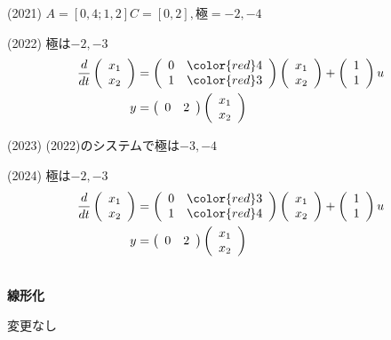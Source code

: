 (2021) $A=[0,4;1,2] C=[0,2], 極=-2,-4$

(2022) 極は{\color{red}$-2, -3$}
\begin{align*}
	\frac{d}{dt}
	\left (
	\begin{array}{c}
	 x_1 \\ x_2 
	\end{array}
	\right )
	& = 
	\left (
	\begin{array}{cc}
	 0 & {\color{red}4} \\
	 1 & {\color{red}3}
	\end{array}
	\right )
	\left (
	\begin{array}{c}
	 x_1 \\ x_2 
	\end{array}
	\right )
	+
	\left (
	\begin{array}{c}
	 1 \\ 1 
	\end{array}
	\right )
	u
\\
	y&=
	\left ( \begin{array}{cc}
		0 & 2 
	\end{array} \right )
	\left (	\begin{array}{c}
		x_1 \\ x_2 
	\end{array} \right )
\end{align*}

(2023) (2022)のシステムで極は{\color{red}$-3, -4$}

(2024) 極は{\color{red}$-2, -3$}
\begin{align*}
	\frac{d}{dt}
	\left (
	\begin{array}{c}
	 x_1 \\ x_2 
	\end{array}
	\right )
	& = 
	\left (
	\begin{array}{cc}
	 0 & {\color{red}3} \\
	 1 & {\color{red}4}
	\end{array}
	\right )
	\left (
	\begin{array}{c}
	 x_1 \\ x_2 
	\end{array}
	\right )
	+
	\left (
	\begin{array}{c}
	 1 \\ 1 
	\end{array}
	\right )
	u
\\
	y&=
	\left ( \begin{array}{cc}
		0 & 2 
	\end{array} \right )
	\left (	\begin{array}{c}
		x_1 \\ x_2 
	\end{array} \right )
\end{align*}

\ \\ \noindent
{\bf 線形化}

変更なし




